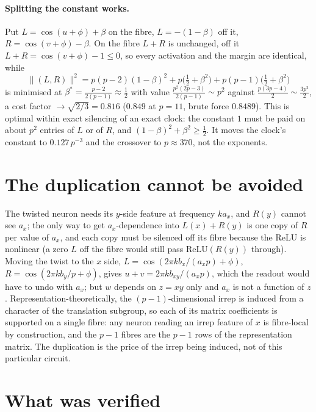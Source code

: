 \documentclass[11pt]{article}
\theoremstyle{remark}
\newcommand{\relu}{\mathrm{ReLU}}
\newcommand{\norm}[1]{\lVert #1 \rVert}
\begin{document}
\paragraph{Splitting the constant works.} Put $L = \cos(u+\phi) + \beta$ on the fibre, $L = -(1-\beta)$ off it, $R = \cos(v+\phi) - \beta$.
On the fibre $L + R$ is unchanged, off it $L + R = \cos(v+\phi) - 1 \le 0$, so every activation and the margin are identical, while
\[
\norm{(L,R)}^2 = p(p-2)(1-\beta)^2 + p\bigl(\tfrac12 + \beta^2\bigr) + p(p-1)\bigl(\tfrac12 + \beta^2\bigr)
\]
is minimised at $\beta^{*} = \tfrac{p-2}{2(p-1)} \approx \tfrac12$ with value $\tfrac{p^2(2p-3)}{2(p-1)} \sim p^2$ against $\tfrac{p(3p-4)}{2} \sim \tfrac{3p^2}{2}$,
a cost factor $\to \sqrt{2/3} = 0.816$ ($0.849$ at $p = 11$, brute force $0.8489$). This is optimal within exact silencing of an exact clock:
the constant $1$ must be paid on about $p^2$ entries of $L$ or of $R$, and $(1-\beta)^2 + \beta^2 \ge \tfrac12$. It moves the clock's constant
to $0.127\, p^{-3}$ and the crossover to $p \approx 370$, not the exponents.

\section{The duplication cannot be avoided}

The twisted neuron needs its $y$-side feature at frequency $k a_x$, and $R(y)$ cannot see $a_x$; the only way to get $a_x$-dependence into
$L(x) + R(y)$ is one copy of $R$ per value of $a_x$, and each copy must be silenced off its fibre because the ReLU is nonlinear (a zero
$L$ off the fibre would still pass $\relu(R(y))$ through). Moving the twist to the $x$ side, $L = \cos(2\pi k b_x/(a_x p) + \phi)$,
$R = \cos(2\pi k b_y/p + \phi)$, gives $u + v = 2\pi k b_{xy}/(a_x p)$, which the readout would have to undo with $a_x$; but $w$ depends on
$z = xy$ only and $a_x$ is not a function of $z$. Representation-theoretically, the $(p-1)$-dimensional irrep is induced from a character
of the translation subgroup, so each of its matrix coefficients is supported on a single fibre: any neuron reading an irrep feature of
$x$ is fibre-local by construction, and the $p-1$ fibres are the $p-1$ rows of the representation matrix. The duplication is the price of
the irrep being induced, not of this particular circuit.

\section{What was verified}
\end{document}
